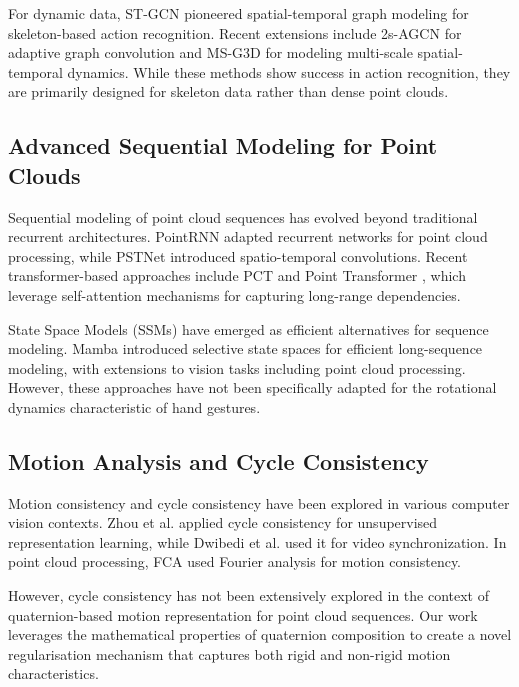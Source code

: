 \documentclass[journal]{IEEEtran}
\theoremstyle{plain}
\begin{document}
For dynamic data, ST-GCN \cite{yan2018spatial} pioneered spatial-temporal graph modeling for skeleton-based action recognition. Recent extensions include 2s-AGCN \cite{shi2019two} for adaptive graph convolution and MS-G3D \cite{liu2021disentangled} for modeling multi-scale spatial-temporal dynamics. While these methods show success in action recognition, they are primarily designed for skeleton data rather than dense point clouds.

\subsection{Advanced Sequential Modeling for Point Clouds}
Sequential modeling of point cloud sequences has evolved beyond traditional recurrent architectures. PointRNN \cite{fan19pointrnn} adapted recurrent networks for point cloud processing, while PSTNet \cite{fan2021pstnet} introduced spatio-temporal convolutions. Recent transformer-based approaches include PCT \cite{guo2021pct} and Point Transformer \cite{zhao2021point}, which leverage self-attention mechanisms for capturing long-range dependencies.

State Space Models (SSMs) have emerged as efficient alternatives for sequence modeling. Mamba \cite{gu2023mamba} introduced selective state spaces for efficient long-sequence modeling, with extensions to vision tasks including point cloud processing. However, these approaches have not been specifically adapted for the rotational dynamics characteristic of hand gestures.

\subsection{Motion Analysis and Cycle Consistency}
Motion consistency and cycle consistency have been explored in various computer vision contexts. Zhou et al. \cite{zhou2018learning} applied cycle consistency for unsupervised representation learning, while Dwibedi et al. \cite{Dwibedi_2019_CVPR} used it for video synchronization. In point cloud processing, FCA \cite{zhang2020frequency} used Fourier analysis for motion consistency.

However, cycle consistency has not been extensively explored in the context of quaternion-based motion representation for point cloud sequences. Our work leverages the mathematical properties of quaternion composition to create a novel regularisation mechanism that captures both rigid and non-rigid motion characteristics.
\end{document}
